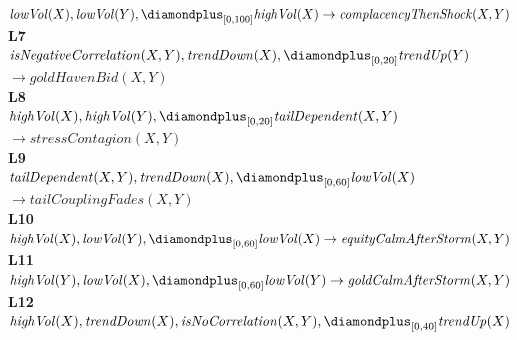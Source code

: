 \begin{figure}[t]
{\begin{minipage}{0.95\textwidth}
\hspace*{1.5em}\mbox{$\mathit{lowVol}(X), \mathit{lowVol}(Y), \diamondplus_{[0,100]} \mathit{highVol}(X) \to \mathit{complacencyThenShock}(X,Y)$}\\[4pt]
\textbf{L7}\\
\hspace*{1.5em}\mbox{$\mathit{isNegativeCorrelation}(X,Y), \mathit{trendDown}(X), \diamondplus_{[0,20]} \mathit{trendUp}(Y)$}\\
\hspace*{1.5em}\hspace*{3em}\mbox{$\to \mathit{goldHavenBid}(X,Y)$}\\[4pt]
\textbf{L8}\\
\hspace*{1.5em}\mbox{$\mathit{highVol}(X), \mathit{highVol}(Y), \diamondplus_{[0,20]} \mathit{tailDependent}(X,Y)$}\\
\hspace*{1.5em}\hspace*{3em}\mbox{$\to \mathit{stressContagion}(X,Y)$}\\[4pt]
\textbf{L9}\\
\hspace*{1.5em}\mbox{$\mathit{tailDependent}(X,Y), \mathit{trendDown}(X), \diamondplus_{[0,60]} \mathit{lowVol}(X)$}\\
\hspace*{1.5em}\hspace*{3em}\mbox{$\to \mathit{tailCouplingFades}(X,Y)$}\\[4pt]
\textbf{L10}\\
\hspace*{1.5em}\mbox{$\mathit{highVol}(X), \mathit{lowVol}(Y), \diamondplus_{[0,60]} \mathit{lowVol}(X) \to \mathit{equityCalmAfterStorm}(X,Y)$}\\[4pt]
\textbf{L11}\\
\hspace*{1.5em}\mbox{$\mathit{highVol}(Y), \mathit{lowVol}(X), \diamondplus_{[0,60]} \mathit{lowVol}(Y) \to \mathit{goldCalmAfterStorm}(X,Y)$}\\[4pt]
\textbf{L12}\\
\hspace*{1.5em}\mbox{$\mathit{highVol}(X), \mathit{trendDown}(X), \mathit{isNoCorrelation}(X,Y), \diamondplus_{[0,40]} \mathit{trendUp}(X)$}\\

\end{minipage}}
\end{figure}
